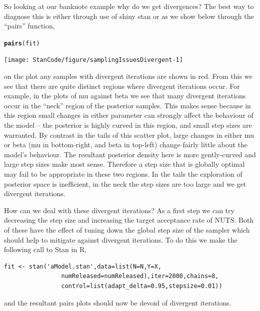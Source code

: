 \documentclass[11pt,fullpage]{book}
\makeatletter
\newenvironment{kframe}{%
	\def\at@end@of@kframe{}%
	\ifinner\ifhmode%
	\def\at@end@of@kframe{\end{minipage}}%
\begin{minipage}{\columnwidth}%
	\fi\fi%
	\def\FrameCommand##1{\hskip\@totalleftmargin \hskip-\fboxsep
		\colorbox{shadecolor}{##1}\hskip-\fboxsep
		\hskip-\linewidth \hskip-\@totalleftmargin \hskip\columnwidth}%
	\MakeFramed {\advance\hsize-\width
		\@totalleftmargin\z@ \linewidth\hsize
		\@setminipage}}%
{\par\unskip\endMakeFramed%
	\at@end@of@kframe}
\newcommand{\hlstd}[1]{\textcolor[rgb]{0.345,0.345,0.345}{#1}}%
\newcommand{\hlkwd}[1]{\textcolor[rgb]{0.737,0.353,0.396}{\textbf{#1}}}%
\newenvironment{knitrout}{}{} %
\makeatother
\begin{document}
So looking at our banknote example why do we get divergences? The best way to diagnose this is either through use of shiny stan or as we show below through the ``pairs'' function,

\begin{knitrout}\footnotesize
		\color{fgcolor}\begin{kframe}
\begin{alltt}
\hlkwd{pairs}\hlstd{(fit)}
\end{alltt}
\texttt{[image: StanCode/figure/samplingIssuesDivergent-1]} 
		\end{kframe}
	\end{knitrout}

on the plot any samples with divergent iterations are shown in red. From this we see that there are quite distinct regions where divergent iterations occur. For example, in the plots of mu against beta we see that many divergent iterations occur in the ``neck'' region of the posterior samples. This makes sense because in this region small changes in either parameter can strongly affect the behaviour of the model -- the posterior is highly curved in this region, and small step sizes are warranted. By contrast in the tails of this scatter plot, large changes in either mu or beta (mu in bottom-right, and beta in top-left) change fairly little about the model's behaviour. The resultant posterior density here is more gently-curved and large step sizes make most sense. Therefore a step size that is globally optimal may fail to be appropriate in these two regions. In the tails the exploration of posterior space is inefficient, in the neck the step sizes are too large and we get divergent iterations.

How can we deal with these divergent iterations? As a first step we can try decreasing the step size and increasing the target acceptance rate of NUTS. Both of these have the effect of tuning down the global step size of the sampler which should help to mitigate against divergent iterations. To do this we make the following call to Stan in R,

\begin{verbatim}
fit <- stan('aModel.stan',data=list(N=N,Y=X,
                numReleased=numReleased),iter=2000,chains=8,
                control=list(adapt_delta=0.95,stepsize=0.01))
\end{verbatim}

and the resultant pairs plots should now be devoid of divergent iterations. 
\end{document}
